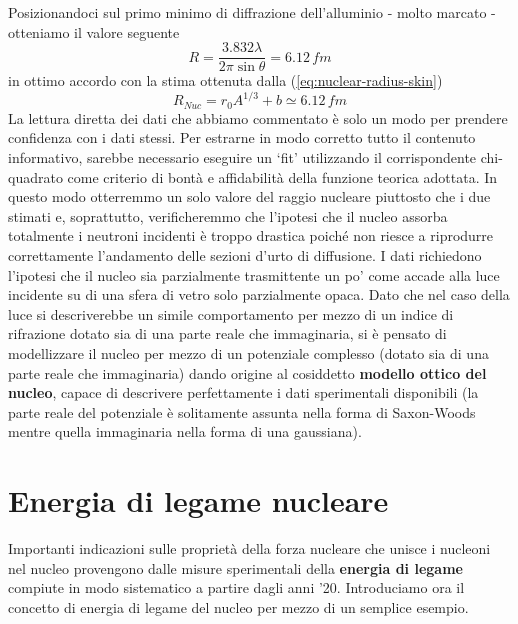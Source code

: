 Posizionandoci sul primo minimo di diffrazione dell’alluminio - molto marcato - otteniamo il valore seguente
\[
 R = \frac{3.832 \lambda}{2 \pi \sin \theta} = 6.12 \, fm
\]
in ottimo accordo con la stima ottenuta dalla (\ref{eq:nuclear-radius-skin})
\[
      R_{Nuc} = r_0 A^{1/3} + b \simeq 6.12 \, fm 
\]
La lettura diretta dei dati che abbiamo commentato è solo un modo per prendere confidenza con i dati stessi.
Per estrarne in modo corretto tutto il contenuto informativo, sarebbe necessario eseguire un ‘fit’ utilizzando il corrispondente chi-quadrato come criterio di bontà e affidabilità della funzione teorica adottata.
In questo modo otterremmo un solo valore del raggio nucleare piuttosto che i due stimati e, soprattutto,
verificheremmo che l’ipotesi che il nucleo assorba totalmente i neutroni incidenti è troppo drastica poiché non riesce a riprodurre correttamente l’andamento delle sezioni d’urto di diffusione.
I dati richiedono l’ipotesi che il nucleo sia parzialmente trasmittente un po’ come accade alla luce incidente su di una sfera di vetro solo parzialmente opaca.
Dato che nel caso della luce si descriverebbe un simile comportamento per mezzo di un indice di rifrazione dotato sia di
una parte reale che immaginaria, si è pensato di modellizzare il nucleo per mezzo di un potenziale complesso (dotato sia
di una parte reale che immaginaria) dando origine al cosiddetto \textbf{modello ottico del nucleo}, capace di descrivere
perfettamente i dati sperimentali disponibili (la parte reale del potenziale è solitamente assunta nella forma di
Saxon-Woods mentre quella immaginaria nella forma di una gaussiana).
\section{Energia di legame nucleare}\label{sec:energia-di-legame-nucleare}
Importanti indicazioni sulle proprietà della forza nucleare che unisce i nucleoni nel nucleo provengono dalle misure sperimentali
della \textbf{energia di legame} compiute in modo sistematico a partire dagli anni ’20.
Introduciamo ora il concetto di energia di legame del nucleo per mezzo di un semplice esempio.

